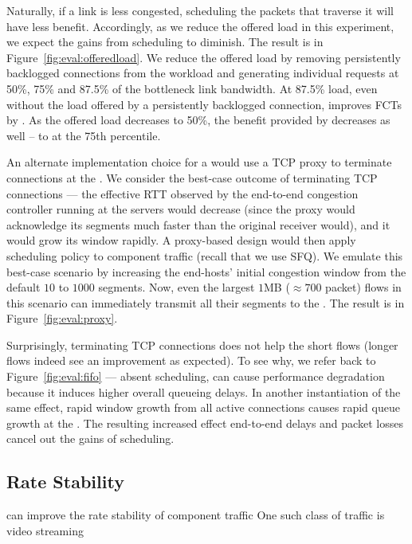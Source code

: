 

 Naturally, if a link is less congested, scheduling the packets that traverse it will have less benefit. Accordingly, as we reduce the offered load in this experiment, we expect the gains from scheduling to diminish. The result is in Figure~\ref{fig:eval:offeredload}. We reduce the offered load by removing persistently backlogged connections from the workload and generating individual requests at 50\%, 75\% and 87.5\% of the bottleneck link bandwidth. 
At 87.5\% load, even without the load offered by a persistently backlogged connection, \name improves FCTs by . 
As the offered load decreases to 50\%, the benefit provided by \name decreases as well -- to  at the 75th percentile.



 An alternate implementation choice for a \name would use a TCP proxy to terminate connections at the \inbox. 
We consider the best-case outcome of terminating TCP connections --- the effective RTT observed by the end-to-end congestion controller running at the servers would decrease (since the proxy would acknowledge its segments much faster than the original receiver would), and it would grow its window rapidly.
A proxy-based design would then apply scheduling policy to component traffic (recall that we use SFQ).
We emulate this best-case scenario by increasing the end-hosts' initial congestion window from the default $10$ to $1000$ segments.
Now, even the largest $1$MB ($\approx700$ packet) flows in this scenario can immediately transmit all their segments to the \inbox.
The result is in Figure~\ref{fig:eval:proxy}.



Surprisingly, terminating TCP connections does not help the short flows (longer flows indeed see an improvement as expected). 
To see why, we refer back to Figure~\ref{fig:eval:fifo} --- absent scheduling, \name can cause performance degradation because it induces higher overall queueing delays.
In another instantiation of the same effect, rapid window growth from all active connections causes rapid queue growth at the \inbox. The resulting increased effect end-to-end delays and packet losses cancel out the gains of scheduling. 

\subsection{Rate Stability}\label{s:eval:ratestable}

\begin{outline}
    \1 \name can improve the rate stability of component traffic
    \1 One such class of traffic is video streaming
\end{outline}
